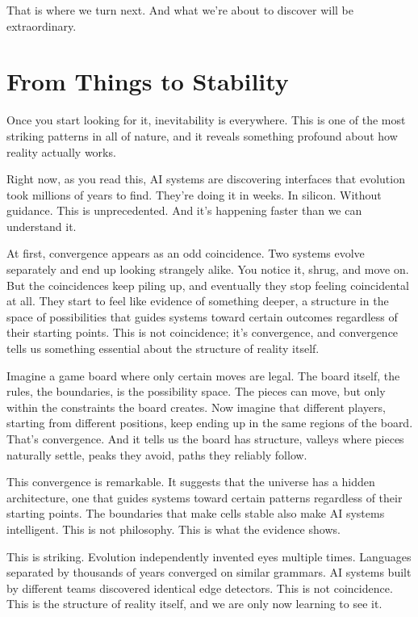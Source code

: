 \documentclass[
  openright]{book}
\begin{document}
That is where we turn next. And what we're about to discover will be
extraordinary.

\chapter{From Things to Stability}\label{from-things-to-stability}

Once you start looking for it, inevitability is everywhere. This is one
of the most striking patterns in all of nature, and it reveals something
profound about how reality actually works.

Right now, as you read this, AI systems are discovering interfaces that
evolution took millions of years to find. They're doing it in weeks. In
silicon. Without guidance. This is unprecedented. And it's happening
faster than we can understand it.

At first, convergence appears as an odd coincidence.
Two systems evolve separately and end up looking strangely alike. You
notice it, shrug, and move on. But the coincidences keep piling up, and
eventually they stop feeling coincidental at all. They start to feel
like evidence of something deeper, a structure in the space of
possibilities that guides systems toward certain outcomes regardless of
their starting points. This is not coincidence; it's convergence, and
convergence tells us something essential about the structure of reality
itself.

Imagine a game board where only certain moves are legal. The board
itself, the rules, the boundaries, is the possibility space. The pieces
can move, but only within the constraints the board creates. Now imagine
that different players, starting from different positions, keep ending
up in the same regions of the board. That's convergence. And it tells us
the board has structure, valleys where pieces naturally settle, peaks
they avoid, paths they reliably follow.

This convergence is remarkable. It suggests that the universe has a
hidden architecture, one that guides systems toward certain patterns
regardless of their starting points. The boundaries that make cells
stable also make AI systems intelligent. This is not philosophy. This is
what the evidence shows.

This is striking. Evolution independently invented eyes multiple times.
Languages separated by thousands of years converged on similar grammars.
AI systems built by different teams discovered identical edge detectors.
This is not coincidence. This is the structure of reality itself, and we
are only now learning to see it.
\end{document}
